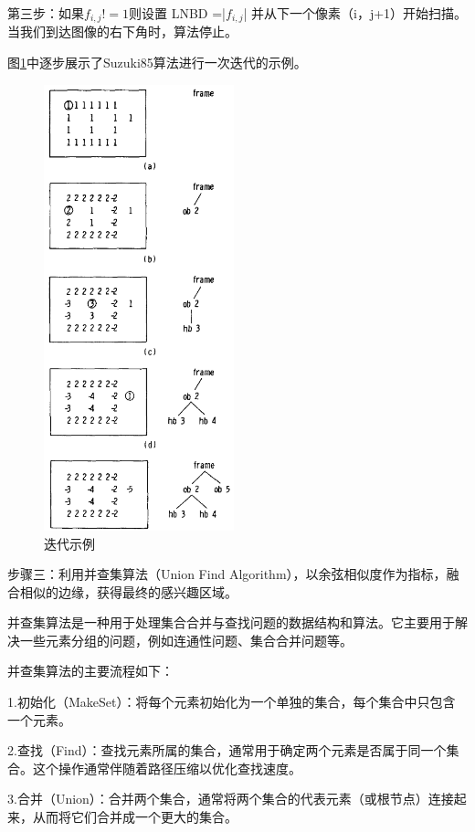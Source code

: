 第三步：如果$f_{i,j}!=1$则设置 LNBD =|$f_{i,j}$| 并从下一个像素（i，j+1）开始扫描。当我们到达图像的右下角时，算法停止。

图\ref{19}中逐步展示了Suzuki85算法进行一次迭代的示例。
\begin{figure}[ht]
    \centering
    \includegraphics[width=0.49\textwidth]{figures/algorithm_example.png}
    \caption{迭代示例}
    \label{19}
\end{figure}

步骤三：利用并查集算法（Union Find Algorithm），以余弦相似度作为指标，融合相似的边缘，获得最终的感兴趣区域。

并查集算法是一种用于处理集合合并与查找问题的数据结构和算法。它主要用于解决一些元素分组的问题，例如连通性问题、集合合并问题等。

并查集算法的主要流程如下：

1.初始化（MakeSet）：将每个元素初始化为一个单独的集合，每个集合中只包含一个元素。

2.查找（Find）：查找元素所属的集合，通常用于确定两个元素是否属于同一个集合。这个操作通常伴随着路径压缩以优化查找速度。

3.合并（Union）：合并两个集合，通常将两个集合的代表元素（或根节点）连接起来，从而将它们合并成一个更大的集合。

